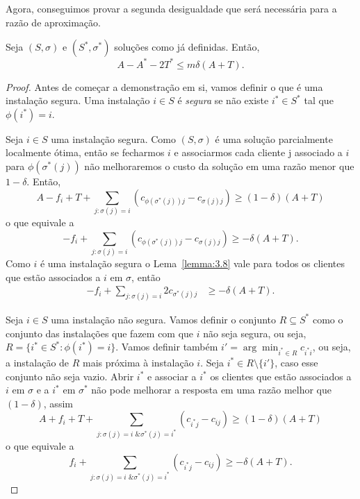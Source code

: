 Agora, conseguimos provar a segunda desigualdade que será necessária para a razão de aproximação.
\begin{lemma}
    \label{lema:3.9}
    Seja $(S,\sigma)$ e $(S^*,\sigma^*)$ soluções como já definidas. Então,
    \[A - A^* - 2T^* \leq m \delta(A+T).\]
\end{lemma}
\begin{proof}
    Antes de começar a demonstração em si, vamos definir o que é uma instalação segura. Uma instalação $i \in S$ é \emph{segura} se não existe $i^* \in S^*$ tal que $\phi(i^*)=i$.

    Seja $i \in S$ uma instalação segura. Como $(S,\sigma)$ é uma solução parcialmente localmente ótima, então se fecharmos $i$ e associarmos cada cliente j associado a $i$ para $\phi(\sigma^*(j))$ não melhoraremos o custo da solução em uma razão menor que $1-\delta$. Então,
    \[
        A - f_i + T + \sum_{j:\sigma(j) = i} (c_{\phi(\sigma^*(j))j} - c_{\sigma(j)j}) \geq (1-\delta)(A+T)\]
        o que equivale a 
        \[
        - f_i + \sum_{j:\sigma(j) = i} (c_{\phi(\sigma^*(j))j} - c_{\sigma(j)j}) \geq -\delta(A+T).
        \]
    Como $i$ é uma instalação segura o Lema~\ref{lemma:3.8} vale para todos os clientes que estão associados a $i$ em $\sigma$, então
    \begin{align} 
        \label{segura}
        - f_i + \sum_{j:\sigma(j) = i} 2c_{\sigma^*(j)j} &\geq -\delta(A+T).
    \end{align}

    Seja $i\in S$ uma instalação não segura. Vamos definir o conjunto $R \subseteq S^*$ como o conjunto das instalações que fazem com que $i$ não seja segura, ou seja, $R = \{i^* \in S^* : \phi(i^*) = i\}$. Vamos definir também $i' = \arg\min_{i^* \in R} c_{i^*i}$, ou seja, a instalação de $R$ mais próxima à instalação $i$.
    Seja $i^* \in R\setminus\{i'\}$, caso esse conjunto não seja vazio. Abrir $i^*$ e associar a $i^*$ os clientes que estão associados a $i$ em $\sigma $ e a $i^*$ em $\sigma^*$ não pode melhorar a resposta em uma razão melhor que $(1-\delta)$, assim
    \[
        A + f_i + T + \sum_{j: \sigma(j) = i \text{ \& } \sigma^*(j) = i^*}(c_{i^*j} - c_{ij})\geq (1-\delta)(A+T)\]
    o que equivale a 
        \begin{equation}
        \label{não segura}
        f_i + \sum_{j: \sigma(j) = i \text{ \& } \sigma^*(j) = i^*}(c_{i^*j} - c_{ij}) \geq -\delta(A+T).        
    \end{equation}    


\end{proof}
